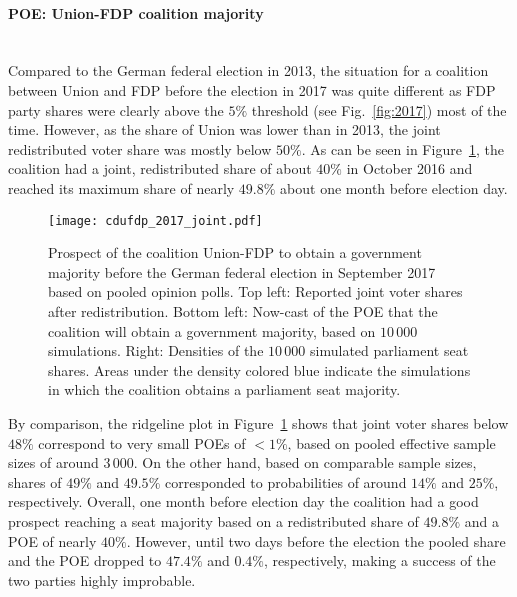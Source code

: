\documentclass[smallextended]{svjour3}      %
\begin{document}
\paragraph{POE: Union-FDP coalition majority} \ \\
Compared to the German federal election in 2013, the situation for a
coalition between Union and FDP before the election in 2017
was quite different as FDP party shares were
clearly above the $5\%$ threshold (see Fig.~\ref{fig:2017}) most of the time.
However, as the share of Union was lower than in 2013,
the joint redistributed voter share was mostly below $50\%$.
As can be seen in Figure~\ref{fig:2017_cdufdp}, the coalition had
a joint, redistributed share of about $40\%$ in October 2016
and reached its maximum share of nearly $49.8\%$ about one month
before election day.

\begin{figure}[H]\centering
\texttt{[image: cdufdp\_2017\_joint.pdf]}
\caption{Prospect of the coalition Union-FDP to obtain a government majority before the
German federal election in September 2017 based on pooled opinion polls.
Top left: Reported joint voter shares after redistribution.
Bottom left: Now-cast of the POE that the coalition will obtain a government
majority, based on $10\,000$ simulations.
Right: Densities of the $10\,000$ simulated parliament seat shares. Areas under
the density colored blue indicate the simulations in which the coalition
obtains a parliament seat majority.
\label{fig:2017_cdufdp}
}
\end{figure}

By comparison, the ridgeline plot in Figure~\ref{fig:2017_cdufdp}
shows that joint voter shares below $48\%$ correspond to very
small POEs of $<1\%$, based on pooled effective sample sizes of around $3\,000$.
On the other hand, based on comparable sample sizes, shares of $49\%$
and $49.5\%$ corresponded to probabilities of around $14\%$ and $25\%$,
respectively.
Overall, one month before election day the coalition had a good prospect
reaching a seat majority based on a redistributed share of $49.8\%$ and
a POE of nearly $40\%$. However, until two days before the election the pooled
share and the POE dropped to $47.4\%$ and $0.4\%$, respectively, making
a success of the two parties highly improbable.

\end{document}
